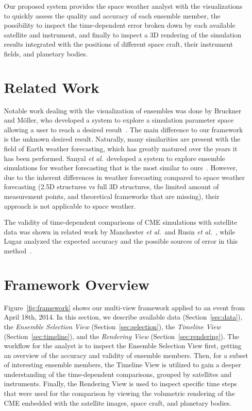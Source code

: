 \documentclass{vgtc}                          %
\def\etal{\textit{et al.}}
\begin{document}
Our proposed system provides the space weather analyst with the visualizations to quickly assess the quality and accuracy of each ensemble member, the possibility to inspect the time-dependent error broken down by each available satellite and instrument, and finally to inspect a 3D rendering of the simulation results integrated with the positions of different space craft, their instrument fields, and planetary bodies.

\section{Related Work}
Notable work dealing with the visualization of ensembles was done by Bruckner and M\"oller, who developed a system to explore a simulation parameter space allowing a user to reach a desired result~\cite{bruckner2010result}. The main difference to our framework is the unknown desired result. Naturally, many similarities are present with the field of Earth weather forecasting, which has greatly matured over the years it has been performed. Sanyal \etal\ developed a system to explore ensemble simulations for weather forecasting that is the most similar to ours~\cite{sanyal2010noodles}. However, due to the inherent differences in weather forecasting compared to space weather forecasting (2.5D structures vs full 3D structures, the limited amount of measurement points, and theoretical frameworks that are missing), their approach is not applicable to space weather.

The validity of time-dependent comparisons of CME simulations with satellite data was shown in related work by Manchester \etal\ and Rusin \etal ~\cite{manchester2008three, rusin2010comparing}, while Lugaz analyzed the expected accuracy and the possible sources of error in this method~\cite{lugaz2010accuracy}.

\section{Framework Overview}
Figure~\ref{fig:framework} shows our multi-view framework applied to an event from April 18th, 2014. In this section, we describe available data (Section~\ref{sec:data}), the \emph{Ensemble Selection View} (Section~\ref{sec:selection}), the \emph{Timeline View} (Section~\ref{sec:timeline}), and the \emph{Rendering View} (Section~\ref{sec:rendering}). The workflow for the analyst is to inspect the Ensemble Selection View first, getting an overview of the accuracy and validity of ensemble members. Then, for a subset of interesting ensemble members, the Timeline View is utilized to gain a deeper understanding of the time-dependent comparisons, grouped by satellites and instruments. Finally, the Rendering View is used to inspect specific time steps that were used for the comparison by viewing the volumetric rendering of the CME embedded with the satellite images, space craft, and planetary bodies.
\end{document}
